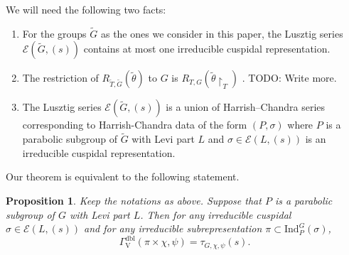 \documentclass[12pt, reqno]{amsart}
\newtheorem{proposition}[theorem]{Proposition}
\theoremstyle{definition}
\theoremstyle{definition}
\theoremstyle{definition}
\newcommand{\hermitianSpace}{\mathrm{V}}
\newcommand{\fieldCharacter}{\psi}
\newcommand{\Ind}[3]{\mathrm{Ind}_{#1}^{#2}\left(#3\right)}
\newcommand{\GroupExtension}[1]{\widetilde{#1}}
\newcommand{\dblGammaFactorSpace}[4]{\Gamma^{\mathrm{dbl}}_{#1}\left(#2 \times #3, #4\right)}
\newcommand{\LusztigSeries}[2]{\mathcal{E}\left(#1, (#2)\right)}
\begin{document}
We will need the following two facts:
\begin{enumerate}
	\item For the groups $\GroupExtension{G}$ as the ones we consider in this paper, the Lusztig series $\LusztigSeries{\GroupExtension{G}}{s}$ contains at most one irreducible cuspidal representation.
	\item The restriction of $R_{\GroupExtension{T},\GroupExtension{G}} \left(\GroupExtension{\theta}\right)$ to $G$ is $R_{T, G} \left(\tilde{\theta} \restriction_T\right)$ \cite[Page 140]{DigneMichel2020}. TODO: Write more.
	\item The Lusztig series $\LusztigSeries{\GroupExtension{G}}{s}$ is a union of Harrish--Chandra series corresponding to Harrish-Chandra data of the form $\left(P,\sigma\right)$ where $P$ is a parabolic subgroup of $\GroupExtension{G}$ with Levi part $L$ and $\sigma \in \LusztigSeries{L}{s}$ is an irreducible cuspidal representation.
\end{enumerate}
Our theorem is equivalent to the following statement.
\begin{proposition}
	Keep the notations as above. Suppose that $P$ is a parabolic subgroup of $G$ with Levi part $L$. Then for any irreducible cuspidal $\sigma \in \LusztigSeries{L}{s}$ and for any irreducible subrepresentation $\pi \subset \Ind{P}{G}{\sigma}$, $$\dblGammaFactorSpace{\hermitianSpace}{\pi}{\chi}{\fieldCharacter} = \tau_{G, \chi, \fieldCharacter}\left(s\right).$$
\end{proposition}
\end{document}
